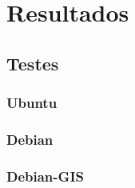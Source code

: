\chapter{Resultados}

\section{Testes}

\subsection{Ubuntu}
\subsection{Debian}

\subsection{Debian-GIS}

